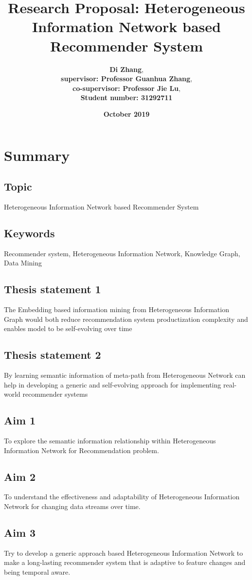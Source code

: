 \documentclass[12pt,a4 paper,title page]{article}
\title{\textbf{Research Proposal: Heterogeneous Information Network based Recommender System}}
\author{\large\textbf{Di Zhang}, \\
\textbf{supervisor: Professor Guanhua Zhang}, \\
\textbf{co-supervisor: Professor Jie Lu}, \\
\textbf{Student number: 31292711}}
\date{\Large{\textbf{October 2019}}}
\begin{document}
\maketitle
\hfill
\hfill

\section*{Summary}

\subsection{Topic} Heterogeneous Information Network based Recommender System

\subsection{Keywords}
Recommender system, Heterogeneous Information Network, Knowledge Graph, Data Mining 

\subsection{Thesis statement 1}
The Embedding based information mining from Heterogeneous Information Graph would both reduce recommendation system productization complexity and enables model to be self-evolving over time

\subsection{Thesis statement 2}
By learning semantic information of meta-path from Heterogeneous Network can help in developing a generic and self-evolving approach for implementing real-world recommender systems  

\subsection{Aim 1}
To explore the semantic information relationship within Heterogeneous Information Network for Recommendation problem.

\subsection{Aim 2}
To understand the effectiveness and adaptability of Heterogeneous Information Network for changing data streams over time. 

\subsection{Aim 3}
Try to develop a generic approach based Heterogeneous Information Network to make a long-lasting recommender system that is adaptive to feature changes and being temporal aware. 
\end{document}

